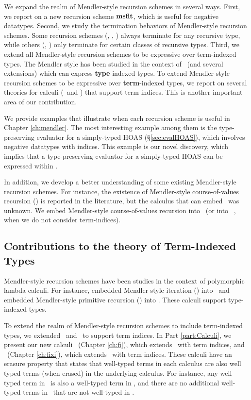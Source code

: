 We expand the realm of Mendler-style recursion schemes in several ways.
First, we report on a new recursion scheme $\mathbf{msfit}$, which is useful
for negative datatypes.  Second, we study the termination behaviors
of Mendler-style recursion schemes. Some recursion schemes (\eg, \MIt, \MsfIt)
always terminate for any recursive type, while others (\eg, \McvPr) only
terminate for certain classes of recursive types. Third, we extend
all Mendler-style recursion schemes to be expressive over term-indexed types.
The Mendler style has been studied in the context of \Fw\ (and several
extensions) which can express {\bf type}-indexed types. To extend Mendler-style
recursion schemes to be expressive over {\bf term}-indexed types, we report on
several theories for calculi (\Fi\ and \Fixi) that support term indices.
This is another important area of our contribution.

We provide examples that illustrate when each recursion scheme is useful
in Chapter \ref{ch:mendler}. The most interesting example among them is
the type-preserving evaluator for a simply-typed HOAS (\S\ref{sec:evalHOAS}),
which involves negative datatypes with indices.
This example is our novel discovery, which implies that
a type-preserving evaluator for a simply-typed HOAS
can be expressed within \Fw.

In addition, we develop a better understanding of some existing
Mendler-style recursion schemes. For instance, the existence of
Mendler-style course-of-values recursion (\McvPr) is reported
in the literature, but the calculus that can embed \McvPr\ was unknown.
We embed Mendler-style course-of-values recursion into \Fixi\ 
(or into \Fixw\ \cite{AbeMat04}, when we do not consider term-indices).

\subsection{Contributions to the theory of Term-Indexed Types}
Mendler-style recursion schemes have been studies in the context of
polymorphic lambda calculi. For instance, \citet{AbeMatUus03} embedded 
Mendler-style iteration (\MIt) into \Fw\ and \citet{AbeMat04} embedded
Mendler-style primitive recursion (\MPr) into \Fixw. These calculi
support type-indexed types.

To extend the realm of Mendler-style recursion schemes to include
term-indexed types, we extended \Fw\ and \Fixw\ to support term indices.
In Part \ref{part:Calculi}, we present our new calculi
\Fi\ (Chapter \ref{ch:fi}), which extends \Fw\ with term indices, and
\Fixi\ (Chapter \ref{ch:fixi}), which extends \Fixw\ with term indices.
These calculi have an erasure property that states that well-typed terms
in each calculus are also well typed terms (when erased) in the 
underlying calculus. For instance, any well typed term in \Fi\ is also
a well-typed term in \Fw, and there are no additional well-typed terms
in \Fi\ that are not well-typed in \Fw.

